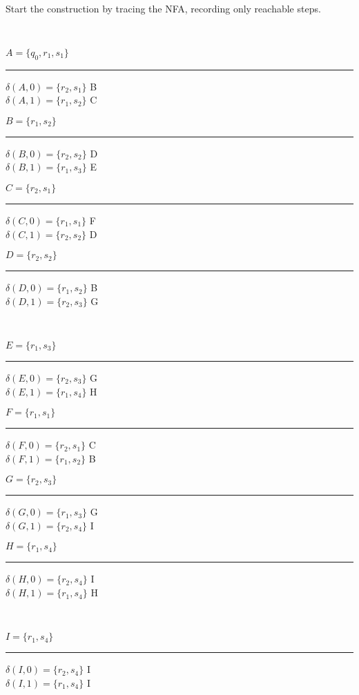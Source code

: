 \begin{problem}{5}\ \\
  Start the construction by tracing the NFA, recording only reachable steps.

  \noindent
  \ \\
  \begin{minipage}[b]{0.25\linewidth}
    $A = \{ q_0, r_1, s_1 \}$
    \hrule
    $\delta(A,0) = \{ r_2, s_1 \} $ B \\
    $\delta(A,1) = \{ r_1, s_2 \} $ C
  \end{minipage}
  \begin{minipage}[b]{0.25\linewidth}
    $B = \{ r_1, s_2 \}$
    \hrule
    $\delta(B,0) = \{ r_2, s_2 \}$ D \\
    $\delta(B,1) = \{ r_1, s_3 \}$ E
  \end{minipage}
  \begin{minipage}[b]{0.25\linewidth}
    $C = \{ r_2, s_1 \}$
    \hrule
    $\delta(C,0) = \{ r_1, s_1 \}$ F \\
    $\delta(C,1) = \{ r_2, s_2 \}$ D
  \end{minipage}
  \begin{minipage}[b]{0.25\linewidth}
    $D = \{ r_2, s_2 \}$
    \hrule
    $\delta(D,0) = \{ r_1, s_2 \}$ B \\
    $\delta(D,1) = \{ r_2, s_3 \}$ G
  \end{minipage}
  \ \\
  \begin{minipage}[b]{0.25\linewidth}
    $E = \{ r_1, s_3 \}$
    \hrule
    $\delta(E,0) = \{ r_2, s_3 \}$ G \\
    $\delta(E,1) = \{ r_1, s_4 \}$ H
  \end{minipage}
  \begin{minipage}[b]{0.25\linewidth}
    $F = \{ r_1, s_1 \}$
    \hrule
    $\delta(F,0) = \{ r_2, s_1 \}$ C \\
    $\delta(F,1) = \{ r_1, s_2 \}$ B
  \end{minipage}
  \begin{minipage}[b]{0.25\linewidth}
    $G = \{ r_2, s_3 \}$
    \hrule
    $\delta(G,0) = \{ r_1, s_3 \}$ G \\
    $\delta(G,1) = \{ r_2, s_4 \}$ I
  \end{minipage}
  \begin{minipage}[b]{0.25\linewidth}
    $H = \{ r_1, s_4 \}$
    \hrule
    $\delta(H,0) = \{ r_2, s_4 \}$ I \\
    $\delta(H,1) = \{ r_1, s_4 \}$ H
  \end{minipage}
  \ \\
  \begin{minipage}[b]{0.25\linewidth}
    $I = \{ r_1, s_4 \}$
    \hrule
    $\delta(I,0) = \{ r_2, s_4 \}$ I \\
    $\delta(I,1) = \{ r_1, s_4 \}$ I
  \end{minipage}


\end{problem}
